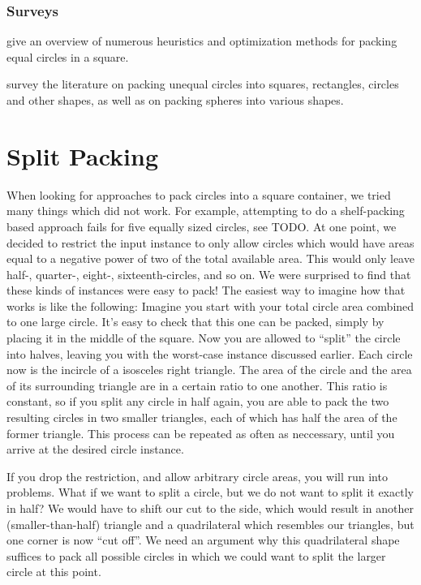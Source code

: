 \documentclass[a4paper,style=print,bibliography=totoc,nexus,lnum,extramargin]{tubsbook}
\begin{document}
\subsection{Surveys}

\textcite{SMCSCG2007new} give an overview of numerous heuristics and optimization methods for packing equal circles in a square.

\textcite{HM2009literature} survey the literature on packing unequal circles into squares, rectangles, circles and other shapes, as well as on packing spheres into various shapes.

\chapter{Split Packing}

When looking for approaches to pack circles into a square container, we tried many things which did not work. For example, attempting to do a shelf-packing based approach fails for five equally sized circles, see TODO. At one point, we decided to restrict the input instance to only allow circles which would have areas equal to a negative power of two of the total available area. This would only leave half-, quarter-, eight-, sixteenth-circles, and so on. We were surprised to find that these kinds of instances were easy to pack! The easiest way to imagine how that works is like the following: Imagine you start with your total circle area combined to one large circle. It's easy to check that this one can be packed, simply by placing it in the middle of the square. Now you are allowed to “split” the circle into halves, leaving you with the worst-case instance discussed earlier. Each circle now is the incircle of a isosceles right triangle. The area of the circle and the area of its surrounding triangle are in a certain ratio to one another. This ratio is constant, so if you split any circle in half again, you are able to pack the two resulting circles in two smaller triangles, each of which has half the area of the former triangle. This process can be repeated as often as neccessary, until you arrive at the desired circle instance.



If you drop the restriction, and allow arbitrary circle areas, you will run into problems. What if we want to split a circle, but we do not want to split it exactly in half? We would have to shift our cut to the side, which would result in another (smaller-than-half) triangle and a quadrilateral which resembles our triangles, but one corner is now “cut off”. We need an argument why this quadrilateral shape suffices to pack all possible circles in which we could want to split the larger circle at this point.
\end{document}
